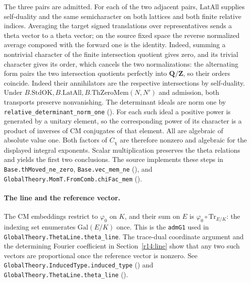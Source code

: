 The three pairs are admitted. For each of the two adjacent pairs,
\(\mathrm{LatAll}\) supplies self-duality and the same semicharacter
on both lattices and both finite relative indices. Averaging the target
signed translations over representatives sends a theta vector to a
theta vector; on the source fixed space the reverse normalized average
composed with the forward one is the identity. Indeed, summing a
nontrivial character of the finite intersection quotient gives zero,
and its trivial character gives its order, which cancels the two
normalizations: the alternating form pairs the two intersection
quotients perfectly into $\mathbf Q/\mathbf Z$, so their orders coincide.
Indeed their annihilators are the respective intersections by self-duality.
Under $B.\mathrm{StdOK},B.\mathrm{LatAll},B.\mathrm{ThZeroMem}(N,N')$
and admission, both transports preserve nonvanishing.
The determinant ideals are norm one by
\nolinkurl{relative_determinant_norm_one}
(). For each such ideal a positive
power is generated by a unitary element, so the corresponding power
of its character is a product of inverses of CM conjugates of that
element. All are algebraic of absolute value one. Both factors of
\(C_\chi\) are therefore nonzero and algebraic for the displayed
integral exponents. Scalar multiplication preserves the theta relations
and yields the first two conclusions. The source implements these steps
in \nolinkurl{Base.thMoved_ne_zero}, \nolinkurl{Base.vec_mem_ne}
(),
and \nolinkurl{GlobalTheory.MomT.FromComb.chiFac_mem}
().

\paragraph{The line and the reference vector.}\label{r14:vec-reference}
The CM embeddings restrict to \(\varphi_0\) on \(K\), and their sum
on \(E\) is \(\varphi_0\circ\mathrm{Tr}_{E/K}\): the indexing set
enumerates \(\mathrm{Gal}(E/K)\) once. This is the
\nolinkurl{admG1} used in \nolinkurl{GlobalTheory.ThetaLine.theta_line}.
The trace-dual coordinate argument and the determining Fourier coefficient
in Section~\ref{r14:line} show that any two such vectors are proportional
once the reference vector is nonzero.
See \nolinkurl{GlobalTheory.InducedType.induced_type}
()
and \nolinkurl{GlobalTheory.ThetaLine.theta_line}
().

